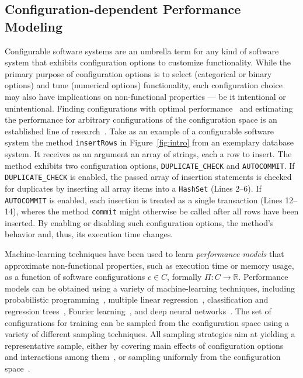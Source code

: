 \subsection{Configuration-dependent Performance Modeling}
Configurable software systems are an umbrella term for any kind of software system that exhibits configuration options to customize functionality. 
While the primary purpose of configuration options is to select (categorical or binary options) and tune (numerical options) functionality, each configuration choice may also have implications on non-functional properties --- be it intentional or unintentional. Finding configurations with optimal performance~\cite{nairUsingBadLearners2017,nairFlash18,ohFindingNearoptimalConfigurations2017} and estimating the performance for arbitrary configurations of the configuration space is an established line of research~\cite{siegmundPerformanceinfluenceModelsHighly2015,haDeepPerf2019,perfAL,guoVariabilityawarePerformancePrediction2013,sarkarCostEfficientSamplingPerformance,guo_2018_data,fourier_learning_2015,perLasso}. 
Take as an example of a configurable software system the method \texttt{insertRows} in Figure~\ref{fig:intro} from an exemplary database system. It receives as an argument an array of strings, each a row to insert. 
The method exhibits two configuration options, \texttt{DUPLICATE\_CHECK} and  \texttt{AUTOCOMMIT}. If \texttt{DUPLICATE\_CHECK} is enabled, the passed array of insertion statements is checked for duplicates by  inserting all array items into a \texttt{HashSet} (\colorbox{duplicatecheck}{Lines 2--6}).
If \texttt{AUTOCOMMIT} is enabled, each insertion is treated as a single transaction (\colorbox{autocommit}{Lines 12–14}), wheres the method \texttt{commit} might otherwise be called  after  all rows have been inserted. By enabling or disabling such configuration options, the method's behavior and, thus, its execution time changes.


Machine-learning techniques have been used to learn \emph{performance models} that approximate non-functional properties, such as execution time or memory usage, as a function of software configurations $c \in C$, formally $\Pi: C \rightarrow \mathbb{R}$.
Performance models can be obtained using a variety of machine-learning techniques, including probabilistic programming~\cite{dorn2020}, multiple linear regression~\cite{siegmundPerformanceinfluenceModelsHighly2015}, classification and regression trees~\cite{sarkarCostEfficientSamplingPerformance,guo_2018_data}, Fourier learning~\cite{fourier_learning_2015,perLasso}, and deep neural networks~\cite{haDeepPerf2019,perfAL}.
The set of configurations for training can be sampled from the configuration space using a variety of different sampling techniques. All sampling strategies aim at yielding a representative sample, either by covering main effects of configuration options and interactions among them~\cite{siegmundPredictingPerformanceAutomated2012}, or sampling uniformly from the configuration space~\cite{ohFindingNearoptimalConfigurations2017,kaltenecker_distance-based_2019}.

